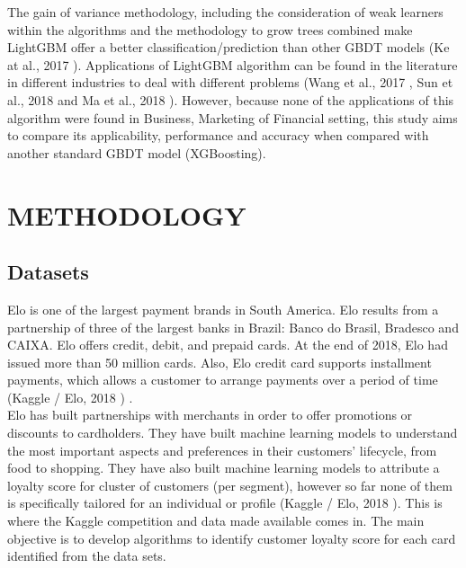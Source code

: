 \documentclass[letterpaper, 10 pt, conference]{ieeeconf}  %
\begin{document}
The gain of variance methodology, including the consideration of weak learners within the algorithms and the methodology to grow trees combined make LightGBM offer a better classification/prediction than other GBDT models (Ke at al., 2017 \cite{LGBM}). Applications of LightGBM algorithm can be found in the literature in different industries to deal with different problems (Wang et al., 2017 \cite{Wang2017}, Sun et al., 2018 \cite{SUN2018} and Ma et al., 2018 \cite{MA201824}). However, because none of the applications of this algorithm were found in Business, Marketing of Financial setting, this study aims to compare its applicability, performance and accuracy when compared with another standard GBDT model (XGBoosting).


\section{METHODOLOGY}
\subsection{Datasets}

Elo is one of the largest payment brands in South America. Elo results from a partnership of three of the largest banks in Brazil: Banco do Brasil, Bradesco and CAIXA. Elo offers credit, debit, and prepaid cards. At the end of 2018, Elo had issued more than 50 million cards. Also, Elo credit card supports installment payments, which allows a customer to arrange payments over a period of time (Kaggle / Elo, 2018 \cite{Kaggle}) .\\

Elo has built partnerships with merchants in order to offer promotions or discounts to cardholders. They have built machine learning models to understand the most important aspects and preferences in their customers’ lifecycle, from food to shopping. They have also built machine learning models to attribute a loyalty score for cluster of customers (per segment), however so far none of them is specifically tailored for an individual or profile (Kaggle / Elo, 2018 \cite{Kaggle}). This is where the Kaggle competition and data made available comes in. The main objective is to develop algorithms to identify customer loyalty score for each card identified from the data sets.\\
\end{document}
